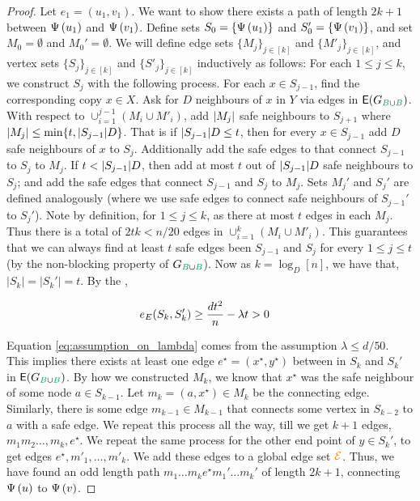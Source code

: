 \documentclass[11pt]{article}
\begin{document}
\begin{proof}
Let $e_1 = (u_1,v_1)$. We want to show there exists a path of length $2k+1$ between $\Embedding{u_1}$ and $\Embedding{v_1}$.
Define sets $S_0 = \{\Embedding{u_1}\}$ and $S'_0 = \{ \Embedding{v_1}\}$, and set $M_0 = \emptyset$ and $M_0' = \emptyset$.
We will define edge sets $\{ M_j\}_{j \in [k]}$ and $ \{ M'_j\}_{j \in [k]}$, and vertex sets $\{ S_j\}_{j \in [k]}$ and $\{ S'_j\}_{j \in [k]}$ inductively as follows: For each $1 \leq j \leq k$, we construct $S_{j}$ with the following process.
For each $x \in S_{j-1}$, find the corresponding copy $x \in X$. Ask for $D$ neighbours of $x$ in $Y$ via edges in $\Edges{\BipartiteG}$.
With respect to $\cup_{i=1}^{j-1} (M_i \cup M'_i)$, add $\Size{M_j}$ safe neighbours to $S_{j+1}$ where $\Size{M_j} \le \min\{t, |S_{j-1}|D\}$.
That is if $\Size{S_{j-1}}D \le t$, then for every $x \in S_{j-1}$ add $D$ safe neighbours of $x$ to $S_j$. Additionally add the safe edges to that connect $S_{j-1}$ to $S_j$ to $M_j$.
If $t < \Size{S_{j-1}}D$, then add at most $t$ out of $\Size{S_{j-1}}D$ safe neighbours to $S_j$; and add the safe edges that connect $S_{j-1}$ and $S_j$ to $M_j$.
Sets $M_j'$ and $S_j'$ are defined analogously (where we use safe edges to connect safe neighbours of $S_{j-1}'$ to $S_j'$).
Note by definition, for $1 \le j \le k$, as there at most $t$ edges in each $M_j$. Thus there is a total of $2tk < n/20$ edges in $\cup_{i=1}^{k} (M_i \cup M'_i)$.
This guarantees that we can always find at least $t$ safe edges been $ S_{j-1}$ and $S_j$ for every $1 \le j \le t$ (by the non-blocking property of $\BipartiteG$).
\flushleft
Now as $k = \log_D[n]$, we have that, $|S_k| = |S_k'|= t$.
By the ,

\begin{align}
\CutEdges{S_k}{S_k'}{E}
 &\geq \frac{d t^2}{n} - \lambda t  > 0 \label{eq:assumption_on_lambda}
\end{align}

Equation \eqref{eq:assumption_on_lambda} comes from the assumption $\lambda \leq d/50$.
This implies there exists at least one edge $e^\star=(x^\star,y^\star)$ between in $S_k$ and $S_k'$ in $\Edges{\BipartiteG}$.
By how we constructed $M_k$, we know that $x^\star$ was the safe neighbour of some node $a \in S_{k-1}$.
Let $m_k = (a,x^\star) \in M_k$ be the connecting edge.
Similarly, there is some edge $m_{k-1} \in M_{k-1}$ that connects some vertex in $S_{k-2}$ to $a$ with a safe edge.
We repeat this process all the way, till we get $k+1$ edges, $m_1 m_2 \dots, m_k, e^\star$.
We repeat the same process for the other end point of $y \in S_k'$, to get edges $e^\star, m'_1, \dots, m'_k$.
We add these edges to a global edge set $\GlobalEdgeSet$.
Thus, we have found an odd length path $m_1\dots m_k e^\star m_1'\dots m_k'$ of length $2k+1$, connecting $\Embedding{u}$ to $\Embedding{v}$.


\end{proof}
\end{document}
